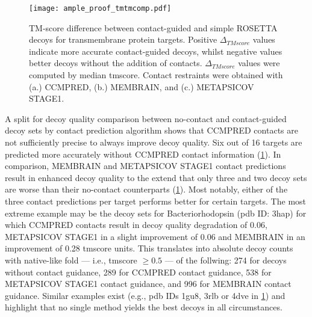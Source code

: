 \begin{figure}[H]
    \centering
    \texttt{[image: ample\_proof\_tmtmcomp.pdf]}
    \caption[TM-score difference between contact-guided and simple ROSETTA decoys]{TM-score difference between contact-guided and simple ROSETTA decoys for transmembrane protein targets. Positive $\Delta_{TMscore}$ values indicate more accurate contact-guided decoys, whilst negative values better decoys without the addition of contacts. $\Delta_{TMscore}$ values were computed by median \gls{tmscore}. Contact restraints were obtained with (a.) CCMPRED, (b.) MEMBRAIN, and (c.) METAPSICOV STAGE1.}
    \label{fig:ample_proof_tmtmcomp}
\end{figure}

A split for decoy quality comparison between no-contact and contact-guided decoy sets by contact prediction algorithm shows that CCMPRED contacts are not sufficiently precise to always improve decoy quality. Six out of 16 targets are predicted more accurately without CCMPRED contact information (\cref{fig:ample_proof_tmtmcomp}). In comparison, MEMBRAIN and METAPSICOV STAGE1 contact predictions result in enhanced decoy quality to the extend that only three and two decoy sets are worse than their no-contact counterparts (\cref{fig:ample_proof_tmtmcomp}). Most notably, either of the three contact predictions per target performs better for certain targets. The most extreme example may be the decoy sets for Bacteriorhodopsin (\gls{pdb} ID: 3hap) for which CCMPRED contacts result in decoy quality degradation of 0.06, METAPSICOV STAGE1 in a slight improvement of 0.06 and MEMBRAIN in an improvement of 0.28 \gls{tmscore} units. This translates into absolute decoy counts with native-like fold --- i.e., \gls{tmscore} $\geq 0.5$ --- of the follwing: 274 for decoys without contact guidance, 289 for CCMPRED contact guidance, 538 for METAPSICOV STAGE1 contact guidance, and 996 for MEMBRAIN contact guidance. Similar examples exist (e.g., \gls{pdb} IDs 1gu8, 3rlb or 4dve in \cref{fig:ample_proof_tmtmcomp}) and highlight that no single method yields the best decoys in all circumstances.


